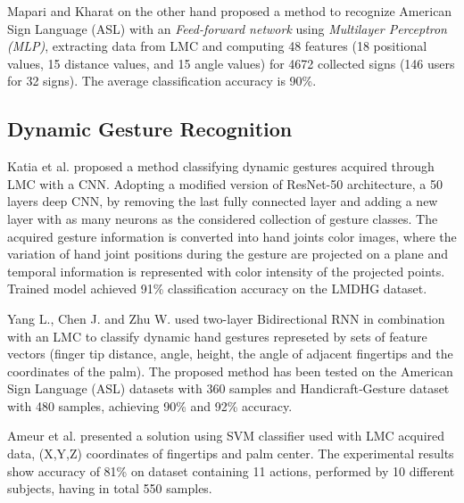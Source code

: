 Mapari and Kharat\cite{mapari} on the other hand proposed a method to recognize American Sign Language (ASL) with an \textit{Feed-forward network} using \textit{Multilayer Perceptron (MLP)}, extracting data from LMC and computing 48 features (18 positional values, 15 distance values, and 15 angle values) for 4672 collected signs (146 users for 32 signs). The average classification accuracy is 90\%.

\subsection{Dynamic Gesture Recognition}

Katia et al. \cite{katiacnn} proposed a method classifying dynamic gestures acquired through LMC with a CNN.
Adopting a modified version of ResNet-50 architecture, a 50 layers deep CNN, by removing the last fully connected layer and adding a new layer with as many neurons as the considered collection of gesture classes. 
The acquired gesture information is converted into hand joints color images, where the variation of hand joint positions during the gesture are projected on a plane and temporal information is represented with color intensity of the projected points. Trained model achieved 91\% classification accuracy on the LMDHG dataset.\cite{lmdhg}

Yang L., Chen J. and Zhu W. \cite{bidirect_dynam} used two-layer Bidirectional RNN in combination with an LMC to classify dynamic hand gestures represeted by sets of feature vectors (finger tip distance, angle, height, the angle of adjacent fingertips and the coordinates of the palm). The proposed method has been tested on the American Sign Language (ASL) datasets with 360 samples and Handicraft‐Gesture dataset with 480 samples, achieving 90\% and 92\% accuracy.\cite{bidirect_dynam}

Ameur et al. \cite{ameur} presented a solution using SVM classifier used with LMC acquired data, (X,Y,Z) coordinates of fingertips and palm center. The experimental results show accuracy of 81\% on dataset containing 11 actions, performed by 10 different subjects, having in total 550 samples.



